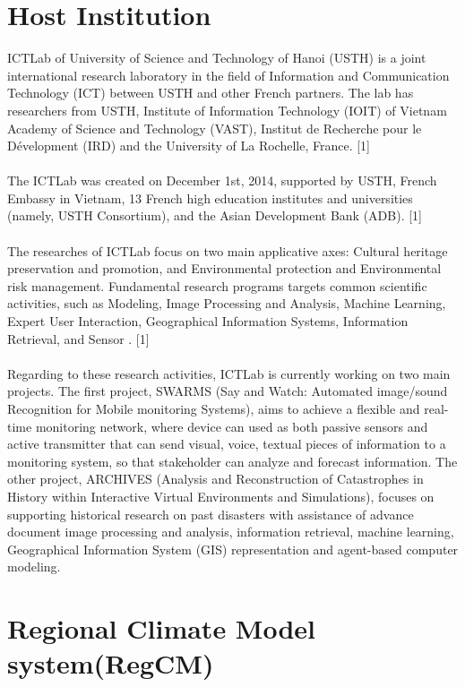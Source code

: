 \section{Host Institution}

ICTLab of University of Science and Technology of Hanoi (USTH) is a joint international research laboratory in the field of Information and Communication Technology (ICT) between USTH and other French partners. The lab has researchers from USTH, Institute of Information Technology (IOIT) of Vietnam Academy of Science and Technology (VAST), Institut de Recherche pour le Dévelopment (IRD) and the University of La Rochelle, France. [1] \\
~\\
The ICTLab was created on December 1st, 2014, supported by USTH, French Embassy in Vietnam, 13 French high education institutes and universities (namely, USTH Consortium), and the Asian Development Bank (ADB). [1] \\
~\\
The researches of ICTLab focus on two main applicative axes: Cultural heritage preservation and promotion, and Environmental protection and Environmental risk management. Fundamental research programs targets common scientific activities, such as Modeling, Image Processing and Analysis, Machine Learning, Expert User Interaction, Geographical Information Systems, Information Retrieval, and Sensor . [1] \\
~\\
Regarding to these research activities, ICTLab is currently working on two main projects. The first project, SWARMS (Say and Watch: Automated image/sound Recognition for Mobile monitoring Systems), aims to achieve a flexible and real-time monitoring network, where device can used as both passive sensors and active transmitter that can send visual, voice, textual pieces of information to a monitoring system, so that stakeholder can analyze and forecast information. The other project, ARCHIVES (Analysis and Reconstruction of Catastrophes in History within Interactive Virtual Environments and Simulations), focuses on supporting historical research on past disasters with assistance of advance document image processing and analysis, information retrieval, machine learning, Geographical Information System (GIS) representation and agent-based computer modeling. \\

\section{Regional Climate Model system(RegCM)}

